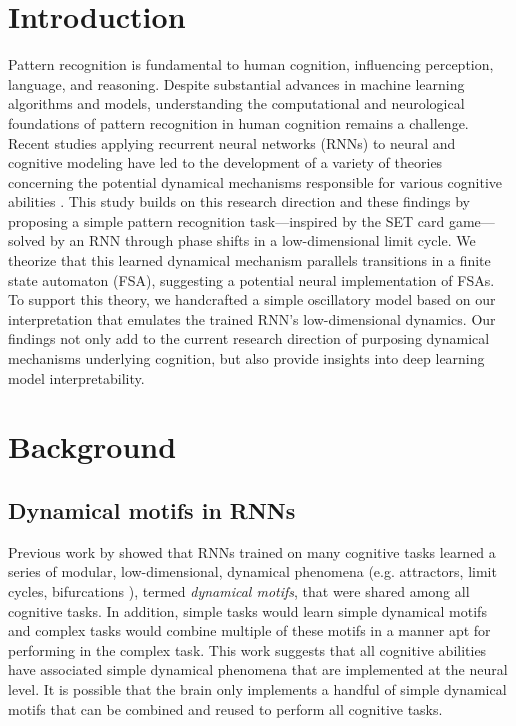 \documentclass[conference]{IEEEtran}
\begin{document}
\section{Introduction}
Pattern recognition is fundamental to human cognition, influencing perception, language, and reasoning\cite{inhelder1964early}. Despite substantial advances in machine learning algorithms and models\cite{bishop2006pattern,lecun2015deep}, understanding the computational and neurological foundations of pattern recognition in human cognition remains a challenge. Recent studies applying recurrent neural networks (RNNs) to neural and cognitive modeling have led to the development of a variety of theories concerning the potential dynamical mechanisms responsible for various cognitive abilities \cite{sussillo2013opening,mante2013context,driscoll2022flexible,kay2022neural,pals2023trained}. This study builds on this research direction and these findings by proposing a simple pattern recognition task---inspired by the SET card game---solved by an RNN through phase shifts in a low-dimensional limit cycle. We theorize that this learned dynamical mechanism parallels transitions in a finite state automaton (FSA), suggesting a potential neural implementation of FSAs. To support this theory, we handcrafted a simple oscillatory model based on our interpretation that emulates the trained RNN's low-dimensional dynamics. Our findings not only add to the current research direction of purposing dynamical mechanisms underlying cognition, but also provide insights into deep learning model interpretability.

\section{Background}

\subsection{Dynamical motifs in RNNs}

Previous work by \cite{driscoll2022flexible} showed that RNNs trained on many cognitive tasks learned a series of modular, low-dimensional, dynamical phenomena (e.g. attractors, limit cycles, bifurcations \cite{strogatz2018nonlinear}), termed \textit{dynamical motifs}, that were shared among all cognitive tasks. In addition, simple tasks would learn simple dynamical motifs and complex tasks would combine multiple of these motifs in a manner apt for performing in the complex task. This work suggests that all cognitive abilities have associated simple dynamical phenomena that are implemented at the neural level. It is possible that the brain only implements a handful of simple dynamical motifs that can be combined and reused to perform all cognitive tasks.
\end{document}
